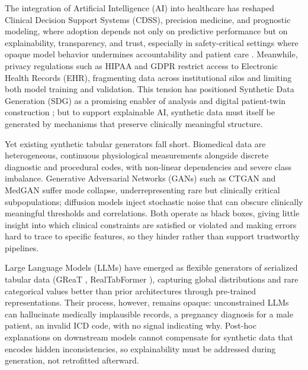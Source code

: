 The integration of Artificial Intelligence (AI) into healthcare has reshaped Clinical Decision Support Systems (CDSS), precision medicine, and prognostic modeling, where adoption depends not only on predictive performance but on explainability, transparency, and trust, especially in safety-critical settings where opaque model behavior undermines accountability and patient care \cite{ghassemi2021falsehope,holzinger2019causability}. Meanwhile, privacy regulations such as HIPAA \cite{hipaa1996} and GDPR \cite{gdpr2016} restrict access to Electronic Health Records (EHR), fragmenting data across institutional silos and limiting both model training and validation. This tension has positioned Synthetic Data Generation (SDG) as a promising enabler of  analysis and digital patient-twin construction \cite{goncalves2020generation,azizi2021can}; but to support explainable AI, synthetic data must itself be generated by mechanisms that preserve clinically meaningful structure.

Yet existing synthetic tabular generators fall short. Biomedical data are heterogeneous, continuous physiological measurements alongside discrete diagnostic and procedural codes, with non-linear dependencies and severe class imbalance. Generative Adversarial Networks (GANs) such as CTGAN \cite{xu2019modeling} and MedGAN \cite{choi2017generating} suffer mode collapse, underrepresenting rare but clinically critical subpopulations; diffusion models \cite{kotelnikov2023tabddpm} inject stochastic noise that can obscure clinically meaningful thresholds and correlations. Both operate as black boxes, giving little insight into which clinical constraints are satisfied or violated and making errors hard to trace to specific features, so they hinder rather than support trustworthy pipelines.

Large Language Models (LLMs) have emerged as flexible generators of serialized tabular data (GReaT \cite{borisov2022language}, RealTabFormer \cite{solatorio2023realtabformer}), capturing global distributions and rare categorical values better than prior architectures through pre-trained representations. Their process, however, remains opaque: unconstrained LLMs can hallucinate medically implausible records, a pregnancy diagnosis for a male patient, an invalid ICD code, with no signal indicating why. Post-hoc explanations on downstream models cannot compensate for synthetic data that encodes hidden inconsistencies, so explainability must be addressed during generation, not retrofitted afterward.

